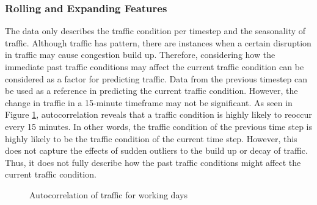 
\subsubsection{Rolling and Expanding Features}

The data only describes the traffic condition per timestep and the seasonality of traffic. Although traffic has pattern, there are instances when a certain disruption in traffic may cause congestion build up. Therefore, considering how the immediate past traffic conditions may affect the current traffic condition can be considered as a factor for predicting traffic. Data  from the previous timestep can be used as a reference in predicting the current traffic condition. However, the change in traffic in a 15-minute timeframe may not be significant. As seen in Figure \ref{autocorr_whyRE}, autocorrelation reveals that a traffic condition is highly likely to reoccur every 15 minutes. In other words, the traffic condition of the previous time step is highly likely to be the traffic condition of the current time step. However, this does not capture the effects of sudden outliers to the build up or decay of traffic. Thus, it does not fully describe how the past traffic conditions might affect the current traffic condition. 


\begin{figure}[!t] 
\centering
  \centering
  \caption{Autocorrelation of traffic for working days}
  \label{autocorr_whyRE}
\end{figure}


